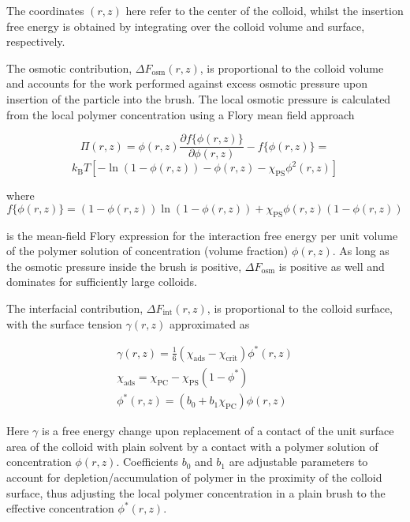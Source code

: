 \documentclass[12pt, a4paper]{article}
\begin{document}
\noindent The coordinates $(r,z)$ here refer to the center of the colloid, whilst the insertion free energy is obtained by integrating over the colloid volume and surface, respectively.

The osmotic contribution, $\Delta F_{\text{osm}}(r,z)$, is proportional to the colloid volume 
and accounts for the work performed against excess osmotic pressure upon insertion of the particle into the brush. 
The local osmotic pressure is calculated from the local polymer concentration using a Flory mean field approach 

$$
\Pi(r,z)=  \phi(r,z)\frac{\partial f\{\phi(r,z)\}}{\partial \phi(r,z)} - f\{\phi(r,z)\}= 
$$
\begin{equation}
	k_{\text{B}}T[-\ln(1-\phi(r,z)) - \phi(r,z) -\chi_{\text{PS}}\phi^2(r,z)]
\end{equation}

\noindent where
$$
f\{\phi(r,z)\}=(1-\phi(r,z))\ln(1-\phi(r,z)) +\chi_{\text{PS}}\phi(r,z)(1-\phi(r,z))
$$

\noindent is the mean-field Flory expression for the interaction free energy per unit volume of the polymer solution of concentration (volume fraction) $\phi(r,z)$.
As long as the osmotic pressure inside the brush is positive, $\Delta F_{\text{osm}}$ is positive as well and dominates for sufficiently large colloids. 

The interfacial contribution, $\Delta F_{\text{int}}(r,z)$, is proportional to the colloid surface, 
with the surface tension $\gamma (r,z)$ approximated as

\begin{eqnarray}
    \gamma (r,z)= \frac{1}{6}(\chi_{\text{ads}} - \chi_{\text{crit}})\phi^{\ast}(r,z)
    \\
    \chi_{\text{ads}} = \chi_{\text{PC}} - \chi_{\text{PS}}(1-\phi^{\ast})
    \\
    \phi^{\ast}(r,z)= (b_{0} + b_{1}\chi_{\text{PC}})\phi(r,z)
\end{eqnarray}

\noindent Here $\gamma$ is a free energy change upon replacement of a contact of the unit surface area of the colloid with plain solvent by a contact with a polymer solution of concentration $\phi(r,z)$.
Coefficients $b_0$ and $b_1$ are adjustable parameters to account for depletion/accumulation of polymer in the proximity of the colloid surface, 
thus adjusting the local polymer concentration in a plain brush to the effective concentration $\phi^{\ast}(r,z)$.
\end{document}
